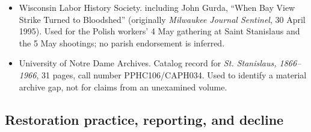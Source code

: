 \begin{itemize}[leftmargin=1.35em,itemsep=0.2em,topsep=0.2em]
\item Wisconsin Labor History Society.  including John Gurda, ``When Bay View Strike Turned to Bloodshed'' (originally \emph{Milwaukee Journal Sentinel}, 30 April 1995). Used for the Polish workers' 4 May gathering at Saint Stanislaus and the 5 May shootings; no parish endorsement is inferred.
\item University of Notre Dame Archives.  Catalog record for \emph{St. Stanislaus, 1866--1966}, 31 pages, call number PPHC106/CAPH034. Used to identify a material archive gap, not for claims from an unexamined volume.
\end{itemize}

\subsection{Restoration practice, reporting, and decline}

